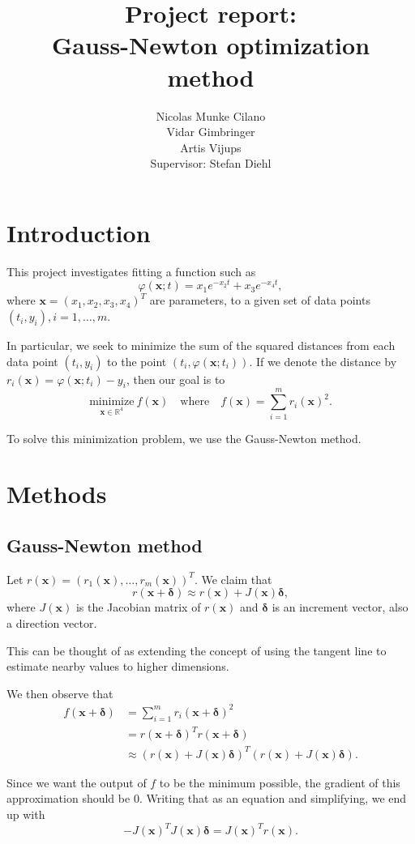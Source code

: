 \documentclass[12pt, a4paper]{article}
\title{Project report:
\\ Gauss-Newton optimization method}
\author{Nicolas Munke Cilano
\\ Vidar Gimbringer 
\\ Artis Vijups 
\vspace{20pt} \\ Supervisor: Stefan Diehl}
\newcommand{\bx}{{\boldsymbol{x}}}
\newcommand{\bd}{{\boldsymbol{\delta}}}
\begin{document}
\maketitle

\section{Introduction}

This project investigates fitting a function such as \[\varphi(\bx; t)=x_1e^{-x_2t}+x_3e^{-x_4t},\] where $\bx={(x_1,x_2,x_3,x_4)}^{T}$ are parameters, to a given set of data points $(t_i,y_i), i=1,\ldots,m$.

In particular, we seek to minimize the sum of the squared distances from each data point $(t_i,y_i)$ to the point $(t_i,\varphi(\bx; t_i))$. If we denote the distance by $r_i(\bx)=\varphi(\bx; t_i)-y_i$, then our goal is to \[\underset{\bx\in\mathbb{R}^4}{\text{minimize}}~f(\bx)\quad\text{where}\quad f(\bx)=\sum_{i=1}^{m}{r_i(\bx)}^2.\]

To solve this minimization problem, we use the Gauss-Newton method.

\section{Methods}

\subsection{Gauss-Newton method}

Let $r(\bx)={(r_1(\bx),\ldots,r_m(\bx))}^T$. We claim that \[r(\bx+\bd)\approx r(\bx)+J(\bx)\bd,\]where $J(\bx)$ is the Jacobian matrix of $r(\bx)$ and $\bd$ is an increment vector, also a direction vector.

This can be thought of as extending the concept of using the tangent line to estimate nearby values to higher dimensions.

We then observe that \begin{align*}
f(\bx+\bd) &= \sum_{i=1}^{m}{r_i(\bx+\bd)}^2 \\ 
&= {r(\bx+\bd)}^T r(\bx+\bd) \\
&\approx {(r(\bx)+J(\bx)\bd)}^T (r(\bx)+J(\bx)\bd).
\end{align*}

Since we want the output of $f $ to be the minimum possible, the gradient of this approximation should be $0$. Writing that as an equation and simplifying, we end up with \[-{J(\bx)}^T J(\bx)\bd={J(\bx)}^T r(\bx).\]
\end{document}
